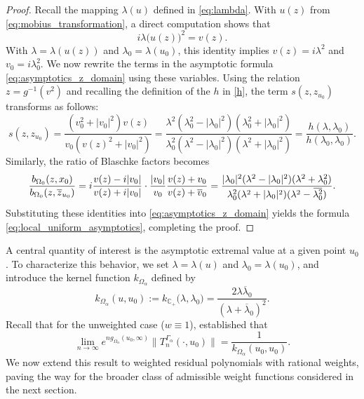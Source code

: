 \documentclass[12pt,oneside,reqno]{amsart}
\theoremstyle{definition}
\numberwithin{equation}{section}
\newcommand{\C}{{\mathbb C}}
\newcommand{\overbar}[1]{\mkern 1.5mu\overline{\mkern-1.5mu#1\mkern-1.5mu}\mkern 1.5mu}
\begin{document}
\begin{proof}
Recall the mapping $\lambda(u)$ defined in \eqref{eq:lambda}. With $u(z)$ from \eqref{eq:mobius_transformation}, a direct computation shows that
\begin{equation}
   i\lambda\bigl( u(z) \bigr)^2 = v(z).
\end{equation}
With $\lambda = \lambda(u(z))$ and $\lambda_0 = \lambda(u_0)$, this identity implies $v(z) = i\lambda^2$ and $v_0 = i\lambda_0^2$.
We now rewrite the terms in the asymptotic formula \eqref{eq:asymptotics_z_domain} using these variables. Using the relation $z = g^{-1}(v^2)$ and recalling the definition of the $h$ in \eqref{h}, the term $s(z, z_{u_0})$ transforms as follows:
\begin{equation}
   s(z, z_{u_0}) = \frac{(v_0^2+|v_0|^2) v(z)}{v_0 (v(z)^2+|v_0|^2)} 
   = \frac{\lambda^2 (\lambda_0^2 - |\lambda_0|^2)(\lambda_0^2 + |\lambda_0|^2)}{\lambda_0^2 (\lambda^2 - |\lambda_0|^2)(\lambda^2 + |\lambda_0|^2)}
   = \frac{h(\lambda, \lambda_0)}{h(\lambda_0, \lambda_0)}.
\end{equation}
Similarly, the ratio of Blaschke factors becomes
\begin{equation}
	\frac{b_{\Omega_0}(z,x_0)}{b_{\Omega_0}(z,\overline{z}_{u_0})} 
    = i \frac{v(z)-i|v_0|}{v(z)+i|v_0|} \cdot \frac{|v_0|}{v_0}\frac{v(z)+v_0}{v(z)+\overline{v}_0} 
    = \frac{|\lambda_0|^2 (\lambda^2-|\lambda_0|^2) (\lambda^2+\lambda_0^2)}{\lambda_0^2 (\lambda^2+|\lambda_0|^2) (\lambda^2-\overbar{\lambda_0^2})}.
\end{equation}
Substituting these identities into \eqref{eq:asymptotics_z_domain} yields the formula \eqref{eq:local_uniform_asymptotics}, completing the proof.

\end{proof}



A central quantity of interest is the asymptotic extremal value at a given point $u_0$. To characterize this behavior, we set $\lambda = \lambda(u)$ and $\lambda_0 = \lambda(u_0)$, and introduce the kernel function $k_{\Omega_\alpha}$ defined by
\begin{equation}
	k_{\Omega_\alpha}(u,u_0) := k_{\C_+}\bigl(\lambda,\lambda_0\bigr)=\frac{2\lambda \overline{\lambda}_0 }{(\lambda+\overline{\lambda}_0)^2}.
\end{equation}
Recall that for the unweighted case ($w \equiv 1$), \cite{eichinger17} established that
\[\lim_{n\rightarrow \infty}e^{ng_{\Omega_\alpha}(u_0,\infty)}\|T_n^{\Gamma_\alpha}(\cdot,u_0)\| = \frac{1}{k_{\Omega_\alpha}(u_0,u_0)}.\]
We now extend this result to weighted residual polynomials with rational weights, paving the way for the broader class of admissible weight functions considered in the next section.
\end{document}

